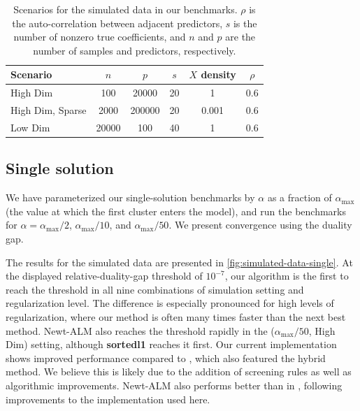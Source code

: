 \documentclass[a4paper,fleqn]{cas-sc}
\begin{document}
\begin{table}[pos=tp]
  \caption{
    Scenarios for the simulated data in our benchmarks. \(\rho\) is the
    auto-correlation between adjacent predictors, \(s\) is the number of nonzero
    true coefficients, and \(n\) and \(p\) are the number of samples and
    predictors, respectively.
  }
  \label{tab:simulated-data}
  \centering
  \begin{tabular}{
      l
      S[table-format=6.0]
      S[table-format=6.0]
      S[table-format=2.0]
      S[table-format=1.3]
      S[table-format=0.1]
    }
    \toprule
    {Scenario}       & {\(n\)} & {\(p\)} & {\(s\)} & {\(X\) density} & {\(\rho\)} \\
    \midrule
    High Dim         & 100     & 20000   & 20      & 1               & 0.6        \\
    High Dim, Sparse & 2000    & 200000  & 20      & 0.001           & 0.6        \\
    Low Dim          & 20000   & 100     & 40      & 1               & 0.6        \\
    \bottomrule
  \end{tabular}
\end{table}

\subsection{Single solution}
\label{sec:single-solution-benchmark}

We have parameterized our single-solution benchmarks by \(\alpha\) as a fraction
of \(\alpha_\text{max}\) (the value at which the first cluster enters the
model), and run the benchmarks for \(\alpha = \alpha_\text{max} / 2\),
\(\alpha_\text{max} / 10\), and \(\alpha_\text{max} / 50\). We present
convergence using the duality gap.

The results for the simulated data are presented in
\autoref{fig:simulated-data-single}. At the displayed relative-duality-gap
threshold of \(10^{-7}\), our algorithm is the first to reach the threshold in
all nine combinations of simulation setting and regularization level. The
difference is especially pronounced for high levels of regularization, where our
method is often many times faster than the next best method. Newt-ALM also
reaches the threshold rapidly in the (\(\alpha_\text{max} / 50\), High Dim)
setting, although \textbf{sortedl1} reaches it first. Our current implementation
shows improved performance compared to \citet{larsson2023}, which also featured
the hybrid method. We believe this is likely due to the addition of screening
rules as well as algorithmic improvements. Newt-ALM also performs better than in
\citet{larsson2023}, following improvements to the implementation used here.
\end{document}
